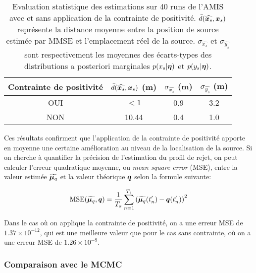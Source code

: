     \begin{table}[h!]
    	\centering
    	
    	\begin{tabular}{cccc}
    		
    		Contrainte de positivité & $\bar{d}(\widehat{{\bm{x}_s}},{\bm{x}_s})$ (m)& $\sigma_{\widehat{x_s}}$ (m)& $\sigma_{\widehat{y_s}}$ (m)\\
    		\hline
    		OUI                   & {$<1$}  	& 0.9        & 3.2        \\
    		NON                   & 10.44   & 0.4        & 1.0 \\      
    		\hline
    	\end{tabular}
    	\caption{Evaluation statistique des estimations sur 40 runs de l'AMIS avec et sans application de la contrainte de positivité. $\bar{d}(\widehat{{\bm{x}_s}},{\bm{x}_s})$ représente la distance moyenne entre la position de source estimée par MMSE et l'emplacement réel de la source. $\sigma_{\widehat{x_s}}$ et $\sigma_{\widehat{y_s}}$ sont respectivement les moyennes des écarts-types des distributions a posteriori marginales $p(x_s | {\bm{\eta}})$ et $p(y_s | {\bm{\eta}})$. }
    	\label{table_1_AE}
    \end{table}
    
    Ces résultats confirment que l'application de la contrainte de positivité apporte en moyenne une certaine amélioration au niveau de la localisation de la source. Si on cherche à quantifier la précision de l'estimation du profil de rejet, on peut calculer l'erreur quadratique moyenne, ou \textit{mean square error} (MSE), entre la valeur estimée ${\widetilde{\bm{\mu}_q}}$ et la valeur théorique ${\bm{q}}$ selon la formule suivante: 
    
    \begin{equation}
    \text{MSE}({\widetilde{\bm{\mu}_q}}, {\bm{q}}) = \dfrac{1}{T_s}\sum\limits_{n=1}^{T_s}\left({\widetilde{\bm{\mu}_q}}(t'_n) - {\bm{q}}(t'_n)\right)^2
    \label{eq_AE_31}
    \end{equation}
    
Dans le cas où on applique la contrainte de positivité, on a une erreur MSE de $1.37\times10^{-12}$, qui est une meilleure valeur que pour le cas sans contrainte, où on a une erreur MSE de $1.26\times10^{-9}$.  \\

\subsubsection{Comparaison avec le MCMC}

